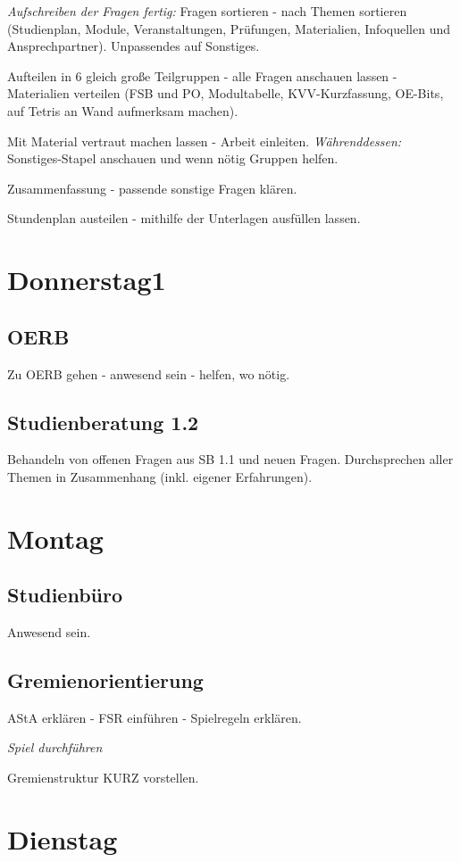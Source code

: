 \documentclass[10pt,a4paper,oneside,ngerman,numbers=noenddot]{scrartcl}
\begin{document}
	\textit{Aufschreiben der Fragen fertig:} Fragen sortieren - nach Themen sortieren (Studienplan, Module, Veranstaltungen, Prüfungen, Materialien, Infoquellen und Ansprechpartner). Unpassendes auf Sonstiges.
	
	Aufteilen in 6 gleich große Teilgruppen - alle Fragen anschauen lassen - Materialien verteilen (FSB und PO, Modultabelle, KVV-Kurzfassung, OE-Bits, auf Tetris an Wand aufmerksam machen).
	
	Mit Material vertraut machen lassen - Arbeit einleiten. \textit{Währenddessen:} Sonstiges-Stapel anschauen und wenn nötig Gruppen helfen.
	
	Zusammenfassung - passende sonstige Fragen klären.
	
	Stundenplan austeilen - mithilfe der Unterlagen ausfüllen lassen.
\section{Donnerstag1}
	\subsection{OERB}
		Zu OERB gehen - anwesend sein - helfen, wo nötig.
		
	\subsection{Studienberatung 1.2}
		Behandeln von offenen Fragen aus SB 1.1 und neuen Fragen. Durchsprechen aller Themen in Zusammenhang (inkl. eigener Erfahrungen).

\section{Montag}
	\subsection{Studienbüro}
		Anwesend sein.
	\subsection{Gremienorientierung}
		AStA erklären - FSR einführen - Spielregeln erklären.
		
		\textit{Spiel durchführen}
		
		Gremienstruktur KURZ vorstellen.
	
\section{Dienstag}
\end{document}
